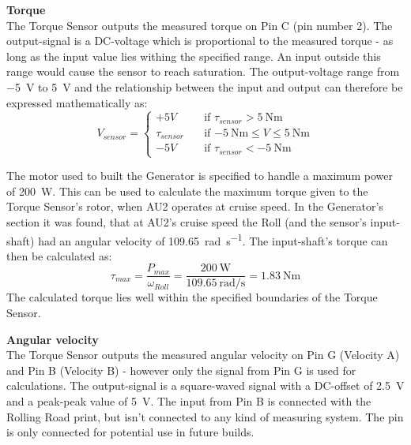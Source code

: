 \textbf{Torque}\\
The Torque Sensor outputs the measured torque on Pin C (pin number 2). The output-signal is a DC-voltage which is proportional to the measured torque - as long as the input value lies withing the specified range. An input outside this range would cause the sensor to reach saturation. The output-voltage range from \SI{-5}{\volt} to \SI{+5}{\volt} and the relationship between the input and output can therefore be expressed mathematically as:
\begin{equation}
	V_{sensor} = 
	\begin{cases}
		+5V				& \quad \text{if } \tau_{sensor} > \SI{+5}{\newton \meter}\\
		\tau_{sensor}   & \quad \text{if } \SI{-5}{\newton \meter} \leq V \leq \SI{+5}{\newton \meter}\\
		-5V				& \quad \text{if } \tau_{sensor} < \SI{-5}{\newton \meter}
	\end{cases}
\end{equation}

The motor used to built the Generator is specified to handle a maximum power of \SI{200}{\watt}\cite{Maxon}. This can be used to calculate the maximum torque given to the Torque Sensor's rotor, when AU2 operates at cruise speed. In the Generator's section it was found, that at AU2's cruise speed the Roll (and the sensor's input-shaft) had an angular velocity of \SI[per-mode=fraction]{109.65}{\radian \per \second}. The input-shaft's torque can then be calculated as:
\begin{equation}
	\tau_{max} = \frac{P_{max}}{\omega_{Roll}} = \frac{\SI{200}{\watt}}{\SI[per-mode=fraction]{109.65}{\radian \per \second}} = \SI{1.83}{\newton \meter}
\end{equation}
The calculated torque lies well within the specified boundaries of the Torque Sensor\cite{TorqueSensor}.

\textbf{Angular velocity}\\ 
The Torque Sensor outputs the measured angular velocity on Pin G (Velocity A) and Pin B (Velocity B) - however only the signal from Pin G is used for calculations. The output-signal is a square-waved signal with a DC-offset of \SI{2.5}{\volt} and a peak-peak value of \SI{5}{\volt}. The input from Pin B is connected with the Rolling Road print, but isn't connected to any kind of measuring system. The pin is only connected for potential use in future builds.

